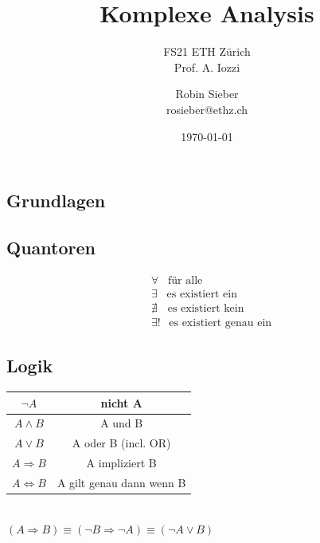 \documentclass[8pt, a4paper, landscape, fleqn]{scrartcl}
\title{Komplexe Analysis}
\subtitle{FS21 ETH Zürich \\Prof. A. Iozzi}
\author{Robin Sieber \\ rosieber@ethz.ch}
\date{\today}
\begin{document}
	\begin{multicols*}{3}
		\maketitle
		\section{Grundlagen}
		    \subsection{Quantoren}
		    	\vspace{-8pt}
				\begin{align*}
					&\forall \hspace{10pt} \text{für alle}\\
					&\exists \hspace{10pt} \text{es existiert ein}\\
					&\nexists \hspace{11pt} \text{es existiert kein}\\
					&\exists! \hspace{9pt} \text{es existiert genau ein}
				\end{align*}
			\subsection{Logik}
		        \begin{tabular}{|c|c|}
					\hline
					$\lnot A$ & nicht A \\
					\hline
					$A \land B$ &  A und B\\
					\hline
					$A\lor B$ & A oder B (incl. OR)\\
					\hline
					$A\Rightarrow B$ & A impliziert B \\
					\hline
					$A\Leftrightarrow B$ & A gilt genau dann wenn B \\
					\hline 
				\end{tabular}\\
				$(A \Rightarrow B) \equiv (\lnot B \Rightarrow \lnot A) \equiv (\lnot A \lor B)$

\end{multicols*}
\end{document}
